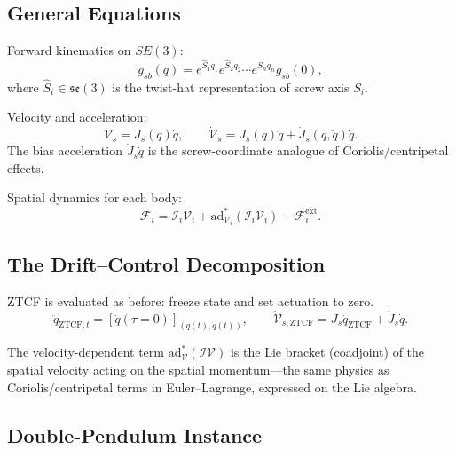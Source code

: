 \documentclass[11pt]{article}
\begin{document}
\subsection{General Equations}

Forward kinematics on $SE(3)$:
\begin{equation}\label{eq:poe-fk}
g_{sb}(q) = e^{\hat{S}_1 q_1}e^{\hat{S}_2 q_2}\cdots e^{\hat{S}_n q_n}g_{sb}(0),
\end{equation}
where $\hat{S}_i\in\mathfrak{se}(3)$ is the twist-hat representation of screw axis $S_i$.

Velocity and acceleration:
\begin{equation}\label{eq:poe-vel}
\mathcal{V}_s = J_s(q)\dot{q}, \qquad
\dot{\mathcal{V}}_s = J_s(q)\ddot{q} + \dot{J}_s(q,\dot{q})\dot{q}.
\end{equation}
The bias acceleration $\dot{J}_s\dot{q}$ is the screw-coordinate analogue of Coriolis/centripetal effects.

Spatial dynamics for each body:
\begin{equation}\label{eq:poe-wrench}
\mathcal{F}_i = \mathcal{I}_i\dot{\mathcal{V}}_i + \mathrm{ad}_{\mathcal{V}_i}^{*}(\mathcal{I}_i\mathcal{V}_i) - \mathcal{F}_i^{\mathrm{ext}}.
\end{equation}

\subsection{The Drift--Control Decomposition}

ZTCF is evaluated as before: freeze state and set actuation to zero.
\begin{equation}
\ddot{q}_{\mathrm{ZTCF},t} = [\ddot{q}(\tau=0)]_{(q(t),\dot{q}(t))}, \qquad
\dot{\mathcal{V}}_{s,\mathrm{ZTCF}} = J_s\ddot{q}_{\mathrm{ZTCF}} + \dot{J}_s\dot{q}.
\end{equation}

The velocity-dependent term $\mathrm{ad}_{\mathcal{V}}^{*}(\mathcal{I}\mathcal{V})$ is the Lie bracket (coadjoint) of the spatial velocity acting on the spatial momentum---the same physics as Coriolis/centripetal terms in Euler--Lagrange, expressed on the Lie algebra.

\subsection{Double-Pendulum Instance}
\end{document}

